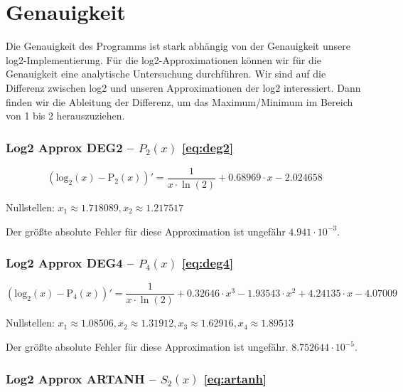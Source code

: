 \section{Genauigkeit}
Die Genauigkeit des Programms ist stark abhängig von der Genauigkeit unsere log2-Implementierung. Für die log2-Approximationen können wir für die Genauigkeit eine analytische Untersuchung durchführen. Wir sind auf die Differenz zwischen log2 und unseren Approximationen der log2 interessiert. Dann finden wir die Ableitung der Differenz, um das Maximum/Minimum im Bereich von 1 bis 2 herauszuziehen.  

\subsubsection*{Log2 Approx DEG2 -- $P_{2}(x)$ \eqref{eq:deg2}}

\begin{equation*}
    (\mathrm{log_{2}}(x) - \mathrm{P_{2}}(x))'
    = \frac{1}{x \cdot \ln(2)} + 0.68969 \cdot x - 2.024658
\end{equation*} \par

Nullstellen: $x_{1} \approx 1.718089, x_{2} \approx 1.217517$ \par

Der größte absolute Fehler für diese Approximation ist ungefähr $4.941 \cdot 10^{-3}$.

\subsubsection*{Log2 Approx DEG4 -- $P_{4}(x)$ \eqref{eq:deg4}}

\begin{equation*}
    (\mathrm{log_{2}}(x) - \mathrm{P_{4}}(x))'
    = \frac{1}{x \cdot \ln(2)} + 0.32646 \cdot x^{3}
    - 1.93543 \cdot x^{2} +4.24135 \cdot x - 4.07009
\end{equation*} \par

Nullstellen: $x_{1} \approx 1.08506,  x_{2} \approx 1.31912, x_{3} \approx 1.62916, x_{4} \approx 1.89513$ \par

Der größte absolute Fehler für diese Approximation ist ungefähr. $8.752644 \cdot 10^{-5}$.

\subsubsection*{Log2 Approx ARTANH -- $S_{2}(x)$ \eqref{eq:artanh}}

